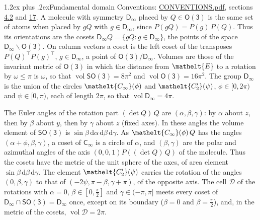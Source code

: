 \documentclass[10pt,a4paper]{article}
\makeatletter
\renewcommand\section{\@startsection{section}{1}{\z@}{-3ex plus -1ex minus -.2ex}%
  {1.2ex plus .2ex}{\normalfont\large\sffamily\bfseries\color{parttitle}}}
\numberwithin{equation}{section}
\newcommand{\eltfont}[1]{{\let\sigma\eltsigma\mathelt{#1}}}
\newcommand{\grp}[1]{\mathsf{#1}}
\newcommand{\elt}[1]{\eltfont{#1}}
\newcommand{\dirvec}[3]{(#1, #2, #3)}
\newcommand{\diff}{\mathrm{d}}
\newcommand{\vol}{\operatorname{vol}}
\newcommand{\fcell}{\mathcal{D}}
\makeatother
\begin{document}
\section{Fundamental domain}\label{s:fundamental_domain}
Conventions: \href{../../CONVENTIONS.pdf}{CONVENTIONS.pdf}, sections \href{../../CONVENTIONS.pdf\#conv.4.2}{4.2} and \href{../../CONVENTIONS.pdf\#conv.17}{17}.
\leavevmode\label{n:element.placement}A molecule with symmetry $\grp{D_{\infty}}$ placed by $Q \in \grp{O(3)}$ is the same set of atoms when placed by $gQ$ with $g \in \grp{D_{\infty}}$, since $P(gQ) = P(g)\,P(Q)$. \label{n:operator.cosets}Thus its orientations are the cosets $\grp{D_{\infty}}Q = \{gQ : g \in \grp{D_{\infty}}\}$, the points of the space $\grp{D_{\infty}}\backslash\grp{O(3)}$. On column vectors a coset is the left coset of the transposes $P(Q)^{\top}P(g)^{\top}$, $g \in \grp{D_{\infty}}$, a point of $\grp{O(3)}/\grp{D_{\infty}}$.
\leavevmode\label{n:operator.volume}Volumes are those of the invariant metric of \href{O3.pdf}{$\grp{O(3)}$} in which the distance from $\elt{E}$ to a rotation by $\omega \le \pi$ is $\omega$, so that $\vol\grp{SO(3)} = 8\pi^2$ and $\vol\grp{O(3)} = 16\pi^2$. The group $\grp{D_{\infty}}$ is the union of the circles $\elt{C_{\infty}}(\phi)$ and $\elt{C_2'}(\psi)$, $\phi \in [0, 2\pi)$ and $\psi \in [0, \pi)$, each of length $2\pi$, so that $\vol\grp{D_{\infty}} = 4\pi$.

\leavevmode\label{n:angle.euler.alpha}\label{n:angle.euler.beta}\label{n:angle.euler.gamma}The Euler angles of the rotation part $(\det Q)\,Q$ are $(\alpha,\beta,\gamma)$: by $\alpha$ about $z$, then by $\beta$ about $y$, then by $\gamma$ about $z$ (fixed axes). In these angles the volume element of \href{SO3.pdf}{$\grp{SO(3)}$} is $\sin\beta\,\diff\alpha\,\diff\beta\,\diff\gamma$. As $\elt{C_{\infty}}(\phi)\,Q$ has the angles $(\alpha + \phi, \beta, \gamma)$, a coset of \href{Cinf.pdf}{$\grp{C_{\infty}}$} is a circle of $\alpha$, and $(\beta, \gamma)$ are the polar and azimuthal angles of the axis $\dirvec{0}{0}{1}P((\det Q)\,Q)$ of the molecule. Thus the cosets have the metric of the unit sphere of the axes, of area element $\sin\beta\,\diff\beta\,\diff\gamma$. The element $\elt{C_2'}(\psi)$ carries the rotation of the angles $(0, \beta, \gamma)$ to that of $(-2\psi, \pi - \beta, \gamma + \pi)$, of the opposite axis.
\leavevmode\label{n:set.cell}The cell $\fcell$ of the rotations with $\alpha = 0$, $\beta \in [0, \tfrac{\pi}{2}]$ and $\gamma \in (-\pi, \pi]$ meets every coset of $\grp{D_{\infty}} \cap \grp{SO(3)} = \grp{D_{\infty}}$ once, except on its boundary ($\beta = 0$ and $\beta = \tfrac{\pi}{2}$), and, in the metric of the cosets, $\vol\fcell = 2\pi$.
\end{document}
